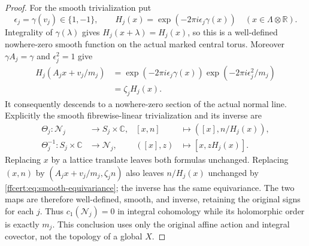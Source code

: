 \begin{proof}
For the smooth trivialization put
\[
 \epsilon_j=\gamma(v_j)\in\{1,-1\},\qquad
 H_j(x)=\exp(-2\pi i\epsilon_j\gamma(x))
 \quad(x\in\Lambda\otimes\mathbb R).
 \tag{FF44}\label{ffcert:eq:smooth-normal-section}
\]
Integrality of $\gamma(\lambda)$ gives $H_j(x+\lambda)=H_j(x)$,
so this is a well-defined nowhere-zero smooth function on the actual
marked central torus. Moreover $\gamma A_j=\gamma$ and
$\epsilon_j^2=1$ give
\[
 \begin{aligned}
 H_j(A_jx+v_j/m_j)
 &=\exp(-2\pi i\epsilon_j\gamma(x))
       \exp(-2\pi i\epsilon_j^2/m_j)\\
 &=\zeta_jH_j(x).
 \end{aligned}
 \tag{FF45}\label{ffcert:eq:smooth-equivariance}
\]
It consequently descends to a nowhere-zero section of the actual
normal line. Explicitly the smooth fibrewise-linear trivialization and
its inverse are
\[
 \begin{aligned}
 \Theta_j:\mathcal N_j&\longrightarrow S_j\times\mathbb C,
 & [x,n]&\longmapsto([x],n/H_j(x)),\\
 \Theta_j^{-1}:S_j\times\mathbb C&\longrightarrow\mathcal N_j,
 & ([x],z)&\longmapsto[x,zH_j(x)].
 \end{aligned}
 \tag{FF46}\label{ffcert:eq:normal-product-isomorphism}
\]
Replacing $x$ by a lattice translate leaves both formulas unchanged.
Replacing $(x,n)$ by
$(A_jx+v_j/m_j,\zeta_jn)$ also leaves $n/H_j(x)$ unchanged by
\eqref{ffcert:eq:smooth-equivariance}; the inverse has the same
equivariance. The two maps are therefore well-defined, smooth, and
inverse, retaining the original signs for each $j$. Thus
$c_1(\mathcal N_j)=0$ in integral cohomology while its holomorphic
order is exactly $m_j$. This conclusion uses only the original affine
action and integral covector, not the topology of a global $X$.
\end{proof}
